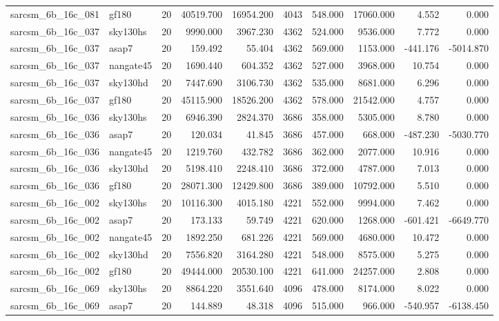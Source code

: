 \documentclass{article}
\begin{document}
\begin{longtable}{llrrrrrrrr}
sarcsm\_6b\_16c\_081 & gf180 & 20 & 40519.700 & 16954.200 & 4043 & 548.000 & 17060.000 & 4.552 & 0.000 \\
sarcsm\_6b\_16c\_037 & sky130hs & 20 & 9990.000 & 3967.230 & 4362 & 524.000 & 9536.000 & 7.772 & 0.000 \\
sarcsm\_6b\_16c\_037 & asap7 & 20 & 159.492 & 55.404 & 4362 & 569.000 & 1153.000 & -441.176 & -5014.870 \\
sarcsm\_6b\_16c\_037 & nangate45 & 20 & 1690.440 & 604.352 & 4362 & 527.000 & 3968.000 & 10.754 & 0.000 \\
sarcsm\_6b\_16c\_037 & sky130hd & 20 & 7447.690 & 3106.730 & 4362 & 535.000 & 8681.000 & 6.296 & 0.000 \\
sarcsm\_6b\_16c\_037 & gf180 & 20 & 45115.900 & 18526.200 & 4362 & 578.000 & 21542.000 & 4.757 & 0.000 \\
sarcsm\_6b\_16c\_036 & sky130hs & 20 & 6946.390 & 2824.370 & 3686 & 358.000 & 5305.000 & 8.780 & 0.000 \\
sarcsm\_6b\_16c\_036 & asap7 & 20 & 120.034 & 41.845 & 3686 & 457.000 & 668.000 & -487.230 & -5030.770 \\
sarcsm\_6b\_16c\_036 & nangate45 & 20 & 1219.760 & 432.782 & 3686 & 362.000 & 2077.000 & 10.916 & 0.000 \\
sarcsm\_6b\_16c\_036 & sky130hd & 20 & 5198.410 & 2248.410 & 3686 & 372.000 & 4787.000 & 7.013 & 0.000 \\
sarcsm\_6b\_16c\_036 & gf180 & 20 & 28071.300 & 12429.800 & 3686 & 389.000 & 10792.000 & 5.510 & 0.000 \\
sarcsm\_6b\_16c\_002 & sky130hs & 20 & 10116.300 & 4015.180 & 4221 & 552.000 & 9994.000 & 7.462 & 0.000 \\
sarcsm\_6b\_16c\_002 & asap7 & 20 & 173.133 & 59.749 & 4221 & 620.000 & 1268.000 & -601.421 & -6649.770 \\
sarcsm\_6b\_16c\_002 & nangate45 & 20 & 1892.250 & 681.226 & 4221 & 569.000 & 4680.000 & 10.472 & 0.000 \\
sarcsm\_6b\_16c\_002 & sky130hd & 20 & 7556.820 & 3164.280 & 4221 & 548.000 & 8575.000 & 5.275 & 0.000 \\
sarcsm\_6b\_16c\_002 & gf180 & 20 & 49444.000 & 20530.100 & 4221 & 641.000 & 24257.000 & 2.808 & 0.000 \\
sarcsm\_6b\_16c\_069 & sky130hs & 20 & 8864.220 & 3551.640 & 4096 & 478.000 & 8174.000 & 8.022 & 0.000 \\
sarcsm\_6b\_16c\_069 & asap7 & 20 & 144.889 & 48.318 & 4096 & 515.000 & 966.000 & -540.957 & -6138.450 \\

\end{longtable}
\end{document}
